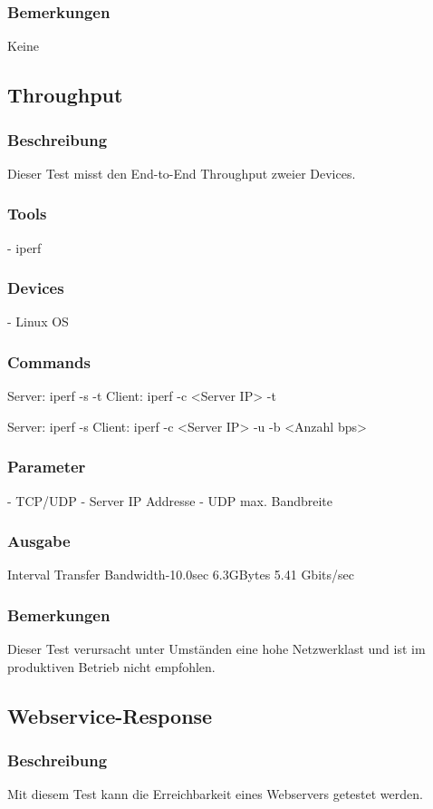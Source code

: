\documentclass[a4,12pt]{scrartcl}
\begin{document}
\subsubsection{Bemerkungen}
Keine

\subsection{Throughput}
\subsubsection{Beschreibung}
Dieser Test misst den End-to-End Throughput zweier Devices.
\subsubsection{Tools}
- iperf
\subsubsection{Devices}
- Linux OS
\subsubsection{Commands}
Server: iperf -s -t
Client: iperf -c <Server IP> -t

Server: iperf -s 
Client: iperf -c <Server IP> -u -b <Anzahl bps>
\subsubsection{Parameter}
- TCP/UDP
- Server IP Addresse
- UDP max. Bandbreite
\subsubsection{Ausgabe}
Interval	Transfer	Bandwidth-10.0sec	6.3GBytes	5.41 Gbits/sec
\subsubsection{Bemerkungen}
Dieser Test verursacht unter Umständen eine hohe Netzwerklast und ist im produktiven Betrieb nicht empfohlen.

\subsection{Webservice-Response}
\subsubsection{Beschreibung}
Mit diesem Test kann die Erreichbarkeit eines Webservers getestet werden.
\end{document}
